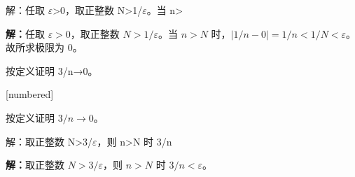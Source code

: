 \documentclass[aspectratio=169,10pt,fontset=fandol]{ctexbeamer}
\makeatletter
\newcommand{\mathagentexerciselabelcontext}[1]{%
\hypertarget<1>{#1}{}%
\edef\@currentHref{#1}%
}
\makeatother
\begin{document}
\begin{frame}[t,fragile]{解：任取 \texorpdfstring{\ensuremath{\varepsilon}}{ε}>0，取正整数 N>1/\texorpdfstring{\ensuremath{\varepsilon}}{ε}。当 n>}
\normalsize
{\normalsize
\par\noindent\textbf{解：}任取 $\varepsilon>0$，取正整数 $N>1/\varepsilon$。当 $n>N$ 时，$|1/n-0|=1/n<1/N<\varepsilon$。故所求极限为 $0$。\par

}
\end{frame}
\begin{frame}[t,fragile]{按定义证明 3/n→0。}
\normalsize
{\normalsize
[numbered]
\mathagentexerciselabelcontext{mathagent.exercise.U0008.0}
\begin{exercise}
\label{mathagent:exercise:0cc0e7ee849eb730aacd59475ce492febad40593b04fd779ce32c70f94e1140f}
按定义证明 $3/n\to0$。
\end{exercise}
}
\end{frame}
\begin{frame}[t,fragile]{解：取正整数 N>3/\texorpdfstring{\ensuremath{\varepsilon}}{ε}，则 n>N 时 3/n}
\normalsize
{\normalsize
\par\noindent\textbf{解：}取正整数 $N>3/\varepsilon$，则 $n>N$ 时 $3/n<\varepsilon$。\par

}
\end{frame}
\end{document}

